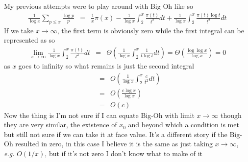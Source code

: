 \documentclass[aps,preprint,preprintnumbers,nofootinbib,showpacs,prd]{revtex4-1}
\newcommand{\eg}{{\it e.g.} }
\newcommand{\nbea}{\begin{eqnarray*}}
\newcommand{\neea}{\end{eqnarray*}}
\begin{document}
My previous attempts were to play around with Big Oh like so
%
\nbea
\frac{1}{\log x} \sum_{p\le x} \frac{\log p}{p} & = & \frac{1}{x} \pi(x) - \frac{1}{\log x}\int_2^x \frac{\pi(t)}{t^2}dt + \frac{1}{\log x}\int_2^x \frac{\pi(t) \log t}{t^2} dt
\neea
%
If we take $x\to\infty$, the first term is obviously zero while the first integral can be represented as so
%
\nbea
\lim_{x\to\infty}\frac{1}{\log x}\int_2^x \frac{\pi(t)}{t^2}dt & = & \Theta\left(\frac{1}{\log x}\int_2^x \frac{1}{t\log t}dt\right) = \Theta\left(\frac{\log \log x}{\log x} \right) = 0
\neea
%
as $x$ goes to infinity so what remains is just the second integral
%
\nbea
& = & O\left(\frac{1}{\log x}\int_2^x \frac{c}{t^2} dt\right) \\
& = & O\left(\frac{c \log x}{\log x}\right) \\ 
& = & O(c)
\neea
%
Now the thing is I'm not sure if I can equate Big-Oh with limit $x\to\infty$ though they are very similar, the existence of $x_0$ and beyond which a condition is met but still not sure if we can take it at face value. It's a different story if the Big-Oh resulted in zero, in this case I believe it is the same as just taking $x\to\infty$, \eg $O(1/x)$, but if it's not zero I don't know what to make of it
\end{document}
